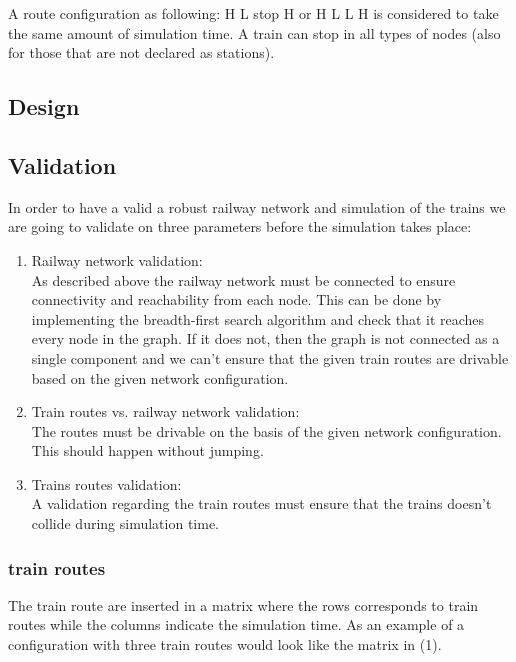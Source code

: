 \documentclass[10pt,a4paper]{article}
\begin{document}
A route configuration as following: H L stop H or H L L H is considered to take the same amount of simulation time. A train can stop in all types of nodes (also for those that are not declared as stations).




\subsection{Design}
\subsection{Validation}
 
In order to have a valid a robust railway network and simulation of the trains we are going to validate on three parameters before the simulation takes place:
\begin{enumerate}
\item Railway network validation: \\
      As described above the railway network must be connected to ensure connectivity and reachability from each node. This can be done by implementing the breadth-first search algorithm and check that it reaches every node in the graph. If it does not, then the graph is not connected as a single component and we can’t ensure that the given train routes are drivable based on the given network configuration.
 
\item Train routes vs. railway network validation: \\
      The routes must be drivable on the basis of the given network configuration. This should happen without jumping.
 
\item Trains routes validation: \\
      A validation regarding the train routes must ensure that the trains doesn’t collide during simulation time. 

\end{enumerate}
 
 
\subsubsection{train routes}
 
The train route are inserted in a matrix where the rows corresponds to train routes while the columns indicate the simulation time.
As an example of a configuration with three train routes would look like the matrix in (1).
\end{document}
